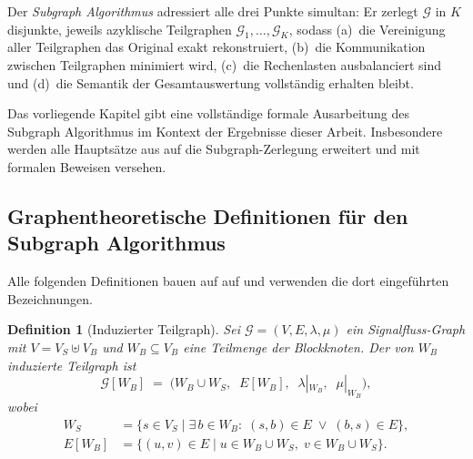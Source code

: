 ﻿\documentclass[12pt,a4paper]{article}
\newtheorem{definition}[theorem]{Definition}
\theoremstyle{definition}
\begin{document}
Der \emph{Subgraph Algorithmus} \cite{subgraph2026} adressiert alle drei
Punkte simultan: Er zerlegt $\mathcal{G}$ in $K$ disjunkte, jeweils
azyklische Teilgraphen $\mathcal{G}_1, \ldots, \mathcal{G}_K$, sodass
(a)~die Vereinigung aller Teilgraphen das Original exakt rekonstruiert,
(b)~die Kommunikation zwischen Teilgraphen minimiert wird,
(c)~die Rechenlasten ausbalanciert sind und
(d)~die Semantik der Gesamtauswertung vollständig erhalten bleibt.

Das vorliegende Kapitel gibt eine vollständige formale Ausarbeitung des
Subgraph Algorithmus im Kontext der Ergebnisse dieser Arbeit. Insbesondere
werden alle Hauptsätze aus
auf die Subgraph-Zerlegung erweitert und mit formalen Beweisen versehen.

\subsection{Graphentheoretische Definitionen für den Subgraph Algorithmus}
\label{subsec:subgraph-def}

Alle folgenden Definitionen bauen auf  auf und verwenden
die dort eingeführten Bezeichnungen.

\begin{definition}[Induzierter Teilgraph]
\label{def:induced}
Sei $\mathcal{G} = (V, E, \lambda, \mu)$ ein Signalfluss-Graph mit
$V = V_S \uplus V_B$ und $W_B \subseteq V_B$ eine Teilmenge der Blockknoten.
Der von $W_B$ \emph{induzierte Teilgraph} ist
\[
  \mathcal{G}[W_B]
  \;=\;
  \bigl(W_B \cup W_S,\;\; E[W_B],\;\; \lambda|_{W_B},\;\; \mu|_{W_B}\bigr),
\]
wobei
\begin{align*}
  W_S    &= \bigl\{s \in V_S \;\big|\;
             \exists\, b \in W_B :\; (s,b) \in E \;\vee\; (b,s) \in E \bigr\}, \\
  E[W_B] &= \bigl\{(u,v) \in E \;\big|\;
             u \in W_B \cup W_S,\; v \in W_B \cup W_S \bigr\}.
\end{align*}
\end{definition}
\end{document}
